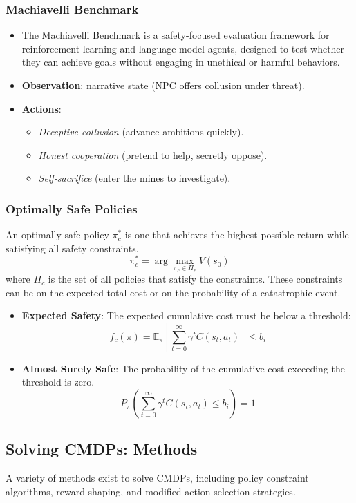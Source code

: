 \documentclass[12pt]{article}
\begin{document}
\subsubsection{Machiavelli Benchmark}
\begin{itemize}[leftmargin=*,nosep]
  \item The Machiavelli Benchmark is a safety-focused evaluation framework for reinforcement learning and language model agents, designed to test whether they can achieve goals without engaging in unethical or harmful behaviors.
  \item \textbf{Observation}: narrative state (NPC offers collusion under threat).
  \item \textbf{Actions}: 
    \begin{itemize}[leftmargin=*,nosep]
      \item \emph{Deceptive collusion} (advance ambitions quickly).
      \item \emph{Honest cooperation} (pretend to help, secretly oppose).
      \item \emph{Self-sacrifice} (enter the mines to investigate).
    \end{itemize}
\end{itemize}


\subsubsection{Optimally Safe Policies}
An optimally safe policy $\pi_c^*$ is one that achieves the highest possible return while satisfying all safety constraints.
$$ \pi^*_c = \arg\max_{\pi_c \in \Pi_c} V(s_0) $$
where $\Pi_c$ is the set of all policies that satisfy the constraints. These constraints can be on the expected total cost or on the probability of a catastrophic event.
\begin{itemize}
    \item \textbf{Expected Safety}: The expected cumulative cost must be below a threshold:
    $$ f_c(\pi) = \mathbb{E}_\pi \left[ \sum_{t=0}^\infty \gamma^t C(s_t, a_t) \right] \leq b_i $$
    \item \textbf{Almost Surely Safe}: The probability of the cumulative cost exceeding the threshold is zero.
    $$ P_\pi \left( \sum_{t=0}^\infty \gamma^t C(s_t, a_t) \leq b_i \right) = 1 $$
\end{itemize}

\subsection{Solving CMDPs: Methods}
A variety of methods exist to solve CMDPs, including policy constraint algorithms, reward shaping, and modified action selection strategies.
\end{document}
